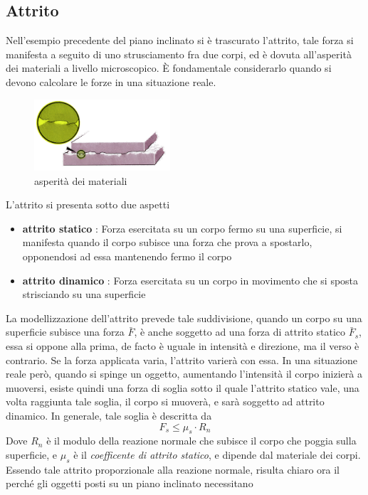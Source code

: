 \documentclass[10pt, letterpaper]{report}
\begin{document}
\subsection{Attrito}
Nell'esempio precedente del piano inclinato si è trascurato l'attrito, tale forza si manifesta a seguito di uno 
strusciamento fra due corpi, ed è dovuta all'asperità dei materiali a livello microscopico. È fondamentale considerarlo 
quando si devono calcolare le forze in una situazione reale.\\
\begin{figure}[h!]
    \centering
    \includegraphics[width=0.45\textwidth]{images/attrito}
    \caption{asperità dei materiali}
\end{figure}\acc
L'attrito si presenta sotto due aspetti\begin{itemize}
    \item \textbf{attrito statico} : Forza esercitata su un corpo fermo su una superficie, si manifesta quando il corpo subisce una forza che prova a spostarlo, opponendosi ad essa mantenendo fermo il corpo 
    \item \textbf{attrito dinamico} : Forza esercitata su un corpo in movimento che si sposta strisciando su una superficie
\end{itemize}
La modellizzazione dell'attrito prevede tale suddivisione, quando un corpo su una superficie subisce 
una forza $\bar F$, è anche soggetto ad una forza di attrito statico $\bar F_s$, essa si oppone alla prima, 
de facto è uguale in intensità e direzione, ma il verso è contrario. Se la forza applicata varia, l'attrito 
varierà con essa.\acc 
In una situazione reale però, quando si spinge un oggetto, aumentando l'intensità il corpo inizierà a muoversi, 
esiste quindi una forza di soglia sotto il quale l'attrito statico vale, una volta raggiunta tale soglia, 
il corpo si muoverà, e sarà soggetto ad attrito dinamico. In generale, tale soglia è descritta da 
$$ F_s\le \mu_s\cdot R_n$$
Dove $R_n$ è il modulo della reazione normale che subisce il corpo che poggia sulla superficie, e 
$\mu_s$ è il \textit{coefficente di attrito statico}, e dipende dal materiale dei corpi. Essendo tale attrito 
proporzionale alla reazione normale, risulta chiaro ora il perché gli oggetti posti su un piano inclinato necessitano
\end{document}
